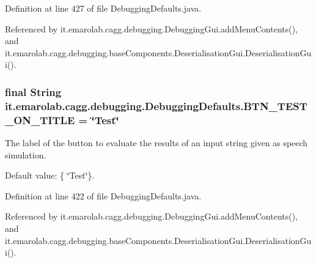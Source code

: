 Definition at line 427 of file Debugging\-Defaults.\-java.



Referenced by it.\-emarolab.\-cagg.\-debugging.\-Debugging\-Gui.\-add\-Menu\-Contents(), and it.\-emarolab.\-cagg.\-debugging.\-base\-Components.\-Deserialisation\-Gui.\-Deserialisation\-Gui().

\hypertarget{classit_1_1emarolab_1_1cagg_1_1debugging_1_1DebuggingDefaults_aa574fc8b31272fde3bc80cc3afa8cd27}{
\subsubsection[{B\-T\-N\-\_\-\-T\-E\-S\-T\-\_\-\-O\-N\-\_\-\-T\-I\-T\-L\-E}]{\setlength{\rightskip}{0pt plus 5cm}final String it.\-emarolab.\-cagg.\-debugging.\-Debugging\-Defaults.\-B\-T\-N\-\_\-\-T\-E\-S\-T\-\_\-\-O\-N\-\_\-\-T\-I\-T\-L\-E = \char`\"{}Test\char`\"{}\hspace{0.3cm}{\ttfamily [static]}}}\label{classit_1_1emarolab_1_1cagg_1_1debugging_1_1DebuggingDefaults_aa574fc8b31272fde3bc80cc3afa8cd27}
The label of the button to evaluate the results of an input string given as speech simulation. \par
 Default value\-: \{ \char`\"{}\-Test\char`\"{}\}. 

Definition at line 422 of file Debugging\-Defaults.\-java.



Referenced by it.\-emarolab.\-cagg.\-debugging.\-Debugging\-Gui.\-add\-Menu\-Contents(), and it.\-emarolab.\-cagg.\-debugging.\-base\-Components.\-Deserialisation\-Gui.\-Deserialisation\-Gui().

